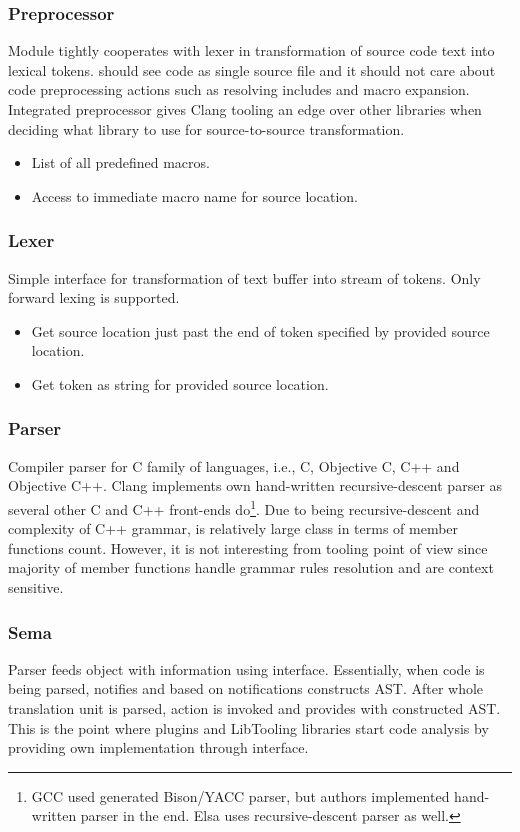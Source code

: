 \subsubsection{Preprocessor}
Module tightly cooperates with lexer in transformation of source code text into lexical tokens.  should see code as single source file and it should not care about code preprocessing actions such as resolving includes and macro expansion. Integrated preprocessor gives Clang tooling an edge over other libraries when deciding what library to use for source-to-source transformation.

\begin{itemize}
\item List of all predefined macros.
\item Access to immediate macro name for source location.
\end{itemize}

\subsubsection{Lexer}
Simple interface for transformation of text buffer into stream of tokens. Only forward lexing is supported.

\begin{itemize}
\item Get source location just past the end of token specified by provided source location.
\item Get token as string for provided source location.
\end{itemize}

\subsubsection{Parser}
Compiler parser for C family of languages, i.e., C, Objective C, C++ and Objective C++. Clang implements own hand-written recursive-descent parser as several other C and C++ front-ends do\footnote{GCC used generated Bison/YACC parser, but authors implemented hand-written parser in the end. Elsa uses recursive-descent parser as well.}. Due to being recursive-descent and complexity of C++ grammar,  is relatively large class in terms of member functions count. However, it is not interesting from tooling point of view since majority of member functions handle grammar rules resolution and are context sensitive.

\subsubsection{Sema}
Parser feeds  object with information using  interface. Essentially, when code is being parsed,  notifies  and based on notifications  constructs AST. After whole translation unit is parsed,  action is invoked and  provides  with constructed AST. This is the point where plugins and LibTooling libraries start code analysis by providing own  implementation through  interface.

